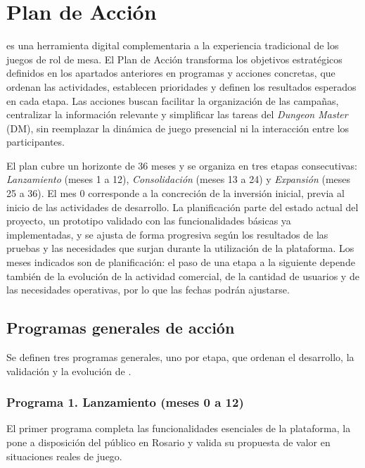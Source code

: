 \capredactadotrue
\section{Plan de Acción}

\nombreproyecto{} es una herramienta digital complementaria a la experiencia tradicional de los juegos de rol de mesa. El Plan de Acción transforma los objetivos estratégicos definidos en los apartados anteriores en programas y acciones concretas, que ordenan las actividades, establecen prioridades y definen los resultados esperados en cada etapa. Las acciones buscan facilitar la organización de las campañas, centralizar la información relevante y simplificar las tareas del \textit{Dungeon Master} (DM), sin reemplazar la dinámica de juego presencial ni la interacción entre los participantes.

El plan cubre un horizonte de 36 meses y se organiza en tres etapas consecutivas: \emph{Lanzamiento} (meses 1 a 12), \emph{Consolidación} (meses 13 a 24) y \emph{Expansión} (meses 25 a 36). El mes 0 corresponde a la concreción de la inversión inicial, previa al inicio de las actividades de desarrollo. La planificación parte del estado actual del proyecto, un prototipo validado con las funcionalidades básicas ya implementadas, y se ajusta de forma progresiva según los resultados de las pruebas y las necesidades que surjan durante la utilización de la plataforma. Los meses indicados son de planificación: el paso de una etapa a la siguiente depende también de la evolución de la actividad comercial, de la cantidad de usuarios y de las necesidades operativas, por lo que las fechas podrán ajustarse.

\subsection{Programas generales de acción}
Se definen tres programas generales, uno por etapa, que ordenan el desarrollo, la validación y la evolución de \nombreproyecto{}.

\subsubsection{Programa 1. Lanzamiento (meses 0 a 12)}
El primer programa completa las funcionalidades esenciales de la plataforma, la pone a disposición del público en Rosario y valida su propuesta de valor en situaciones reales de juego.

